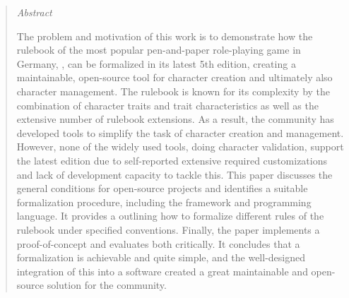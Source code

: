 \clearpage

\begin{abstract} %
\begin{center}
\begin{minipage}{12cm}

    {\Large\textit{Abstract}}

    The problem and motivation of this work is to demonstrate how the rulebook of the most popular pen-and-paper role-playing game in Germany, , can be formalized in its latest 5th edition, creating a maintainable, open-source tool for character creation and ultimately also character management.
    The rulebook is known for its complexity by the combination of character traits and trait characteristics as well as the extensive number of rulebook extensions.
    As a result, the community has developed tools to simplify the task of character creation and management.
    However, none of the widely used tools, doing character validation, support the latest edition due to self-reported extensive required customizations and lack of development capacity to tackle this.
    This paper discusses the general conditions for open-source projects and identifies a suitable formalization procedure, including the framework and programming language.
    It provides a  outlining how to formalize different rules of the rulebook under specified conventions.
    Finally, the paper implements a proof-of-concept and evaluates both critically.
    It concludes that a formalization is achievable and quite simple, and the well-designed integration of this into a software created a great maintainable and open-source solution for the community.

\end{minipage}
\end{center}
\end{abstract}